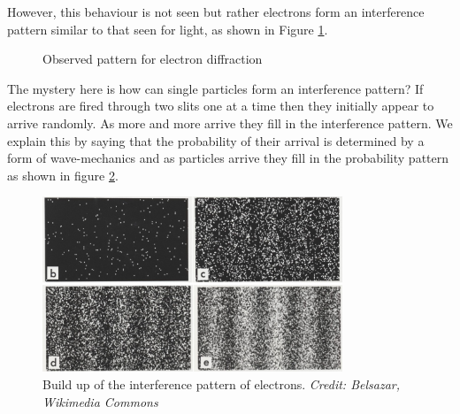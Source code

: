 \documentclass[revision-guide.tex]{subfiles}
\begin{document}
However, this behaviour is not seen but rather electrons form an interference pattern similar to that seen for light, as shown in Figure \ref{fig:electron-diff-observed}.

\begin{figure}[!h]
  \begin{center}
  \end{center}
  \caption{Observed pattern for electron diffraction}
  \label{fig:electron-diff-observed}
\end{figure}

The mystery here is how can single particles form an interference pattern? If electrons are fired through two slits one at a time then they initially appear to arrive randomly. As more and more arrive they fill in the interference pattern. We explain this by saying that the probability of their arrival is determined by a form of wave-mechanics and as particles arrive they fill in the probability pattern as shown in figure \ref{fig:electron-buildup}.

\begin{figure}
  \begin{center}
  \includegraphics[width=0.8\textwidth]{figs/chapt-9/electron-diff.jpg}
\end{center}
  \caption{Build up of the interference pattern of electrons. \emph{Credit: Belsazar, Wikimedia Commons}}
  \label{fig:electron-buildup}
\end{figure}
\end{document}
